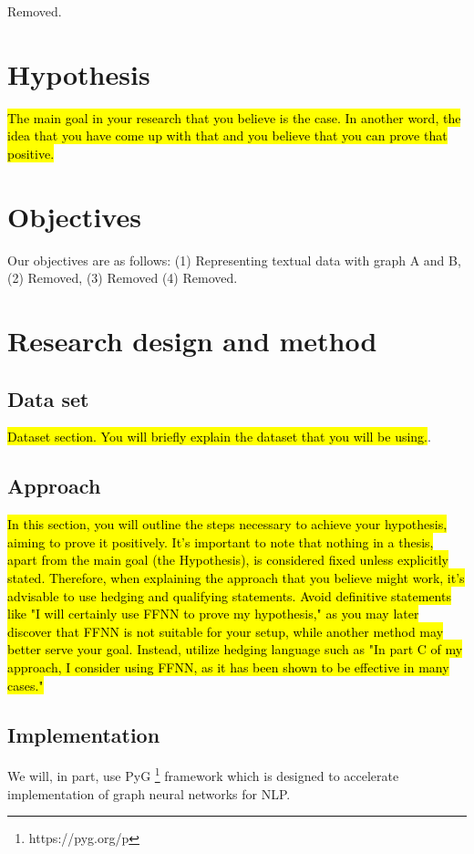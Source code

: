 \documentclass[12pt,onecolumn,a4paper]{article}
\begin{document}
Removed.\\




\section{Hypothesis}
\hl{The main goal in your research that you believe is the case. In another word, the idea that you have come up with that and you believe that you can prove that positive.}

\section{Objectives}
Our objectives are as follows: (1) Representing textual data with graph A and B, (2) Removed, (3) Removed (4) Removed.


\section{Research design and method}

\subsection{Data set}
\hl{Dataset section. You will briefly explain the dataset that you will be using.}.

\subsection{Approach}
\hl{
In this section, you will outline the steps necessary to achieve your hypothesis, aiming to prove it positively. It's important to note that nothing in a thesis, apart from the main goal (the Hypothesis), is considered fixed unless explicitly stated. Therefore, when explaining the approach that you believe might work, it's advisable to use hedging and qualifying statements. Avoid definitive statements like "I will certainly use FFNN to prove my hypothesis," as you may later discover that FFNN is not suitable for your setup, while another method may better serve your goal. Instead, utilize hedging language such as "In part C of my approach, I consider using FFNN, as it has been shown to be effective in many cases."}


\subsection{Implementation}
We will, in part, use PyG \footnote{https://pyg.org/p} framework which is designed to accelerate implementation of graph neural networks for NLP.
\end{document}

